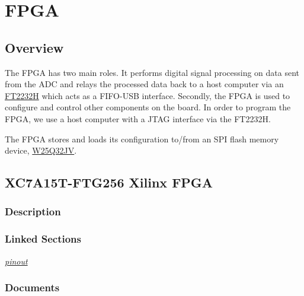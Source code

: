 \section{FPGA}
\label{sec:fpga}

\subsection{Overview}
\label{sec:fpga-overview}

The FPGA has two main roles. It performs digital signal processing on data sent from the ADC and
relays the processed data back to a host computer via an \hyperlink{sec:ft2232h}{FT2232H} which acts
as a FIFO-USB interface. Secondly, the FPGA is used to configure and control other components on the
board. In order to program the FPGA, we use a host computer with a JTAG interface via the FT2232H\@.

The FPGA stores and loads its configuration to/from an SPI flash memory device,
\hyperlink{sec:w25q32jv}{W25Q32JV}.

\subsection{XC7A15T-FTG256 Xilinx FPGA}
\label{sec:xc7a15t-ftg256}

\subsubsection{Description}
\label{sec:xc7a15t-ftg256-description}



\subsubsection{Linked Sections}
\label{sec:xc7a15t-ftg256-linked-sections}

\textit{\hyperref[sec:xc7a15t-ftg256-pinout]{pinout}}

\subsubsection{Documents}
\label{sec:xc7a15t-ftg256-documents}

